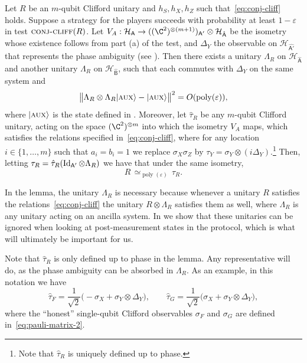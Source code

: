 \documentclass{toc}
\newcommand{\ket}[1]{|#1\rangle}
\newcommand{\Id}{\ensuremath{\mathop{\rm Id}\nolimits}}
\DeclareMathOperator{\poly}{poly}
\newcommand{\reg}[1]{{\textsf{#1}}}
\newcommand{\mH}{\mathcal{H}}
\newcommand{\eps}{\varepsilon}
\newcommand{\aux}{\textsc {aux}}
\newcommand{\conjc}{\textsc{conj-cliff}}
\newcommand{\phase}{\Lambda}
\begin{document}
\begin{lemma}\label{lem:cliff-conj}
Let $R$ be an $m$-qubit Clifford unitary and $h_S,h_X,h_Z$ such that~\eqref{eq:conj-cliff} holds. Suppose a strategy for the players succeeds with probability at least $1-\eps$ in test $\conjc(R)$. Let $V_A:\mH_\reg{A} \to ((\C^2)^{\otimes (m+1)})_{\reg{A}'}  \otimes {\mH}_{\hat{\reg{A}}}$ be the isometry whose existence follows from part (a) of the test, and $\Delta_Y$ the observable on $\mH_{\hat{\reg{A}'}}$ that represents the phase ambiguity (see ). 
Then there exists a unitary $\phase_R$ on ${\mH}_{\hat{\reg{A}}}$ and another unitary $\phase_R$ on ${\mH}_{\hat{\reg{B}}}$, such that each commutes with $\Delta_Y$ on the same system and
\begin{equation}\label{eq:r-stab}
 \big\|\phase_R \otimes \phase_R \ket{\aux} - \ket{\aux} \big\|^2 = O(\poly(\eps)),
\end{equation}
where $\ket{\aux}$ is the state defined in .
Moreover, let $\hat{\tau}_R$ be any $m$-qubit Clifford unitary, acting on the space $(\C^2)^{\otimes m}$ into which the isometry $V_A$ maps, which satisfies the relations specified in~\eqref{eq:conj-cliff}, where for any location $i\in\{1,\ldots,m\}$ such that $a_i=b_i=1$ we replace $\sigma_X\sigma_Z$ by $\tau_Y = \sigma_Y \otimes (i\Delta_Y)$.\footnote{Note that $\hat{\tau}_R$ is uniquely defined up to phase.} Then, letting  $ \tau_R = \hat{\tau}_{R}(\Id_{\reg{A}'} \otimes \phase_R)$ we have that  under the same isometry,
$$R \,\simeq_{\poly(\eps)}\, \tau_R.$$
\end{lemma}

In the lemma, the unitary $\Lambda_R$ is necessary because whenever a unitary $R$ satisfies the relations~\eqref{eq:conj-cliff} the unitary $R\otimes \Lambda_R$ satisfies them as well, where $\Lambda_R$ is any unitary acting on an ancilla system. In  we show that these unitaries can be ignored when looking at post-measurement states in the protocol, which is what will ultimately be important for us.  

Note that $\hat{\tau}_R$ is only defined up to phase in the lemma. Any representative will do, as  the phase ambiguity can be absorbed in $\phase_R$. As an example, in this notation we have 
\begin{equation}\label{eq:hat-tau-def}
\hat{\tau}_F = \frac{1}{\sqrt{2}}\big(-\sigma_X + \sigma_Y \otimes \Delta_Y\big),\qquad \hat{\tau}_G = \frac{1}{\sqrt{2}}\big(\sigma_X + \sigma_Y \otimes \Delta_Y\big),
\end{equation}
where the ``honest'' single-qubit Clifford observables $\sigma_F$ and $\sigma_G$ are defined in~\eqref{eq:pauli-matrix-2}.
\end{document}
